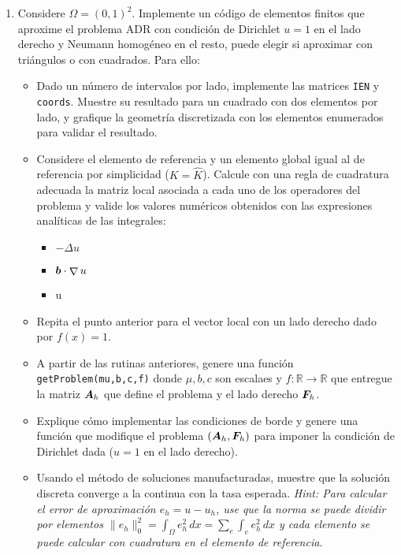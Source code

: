 \documentclass{article}
\renewcommand{\vec}{\vectorsym}
\newcommand{\mat}{\matrixsym}
\DeclareMathOperator{\grad}{\nabla}
\newcommand{\R}{\mathbb{R}}
\newcommand{\pts}[1]{[{\bf #1 puntos}] }
\begin{document}
\begin{enumerate}
    \item Considere $\Omega = (0,1)^2$. Implemente un código de elementos finitos que aproxime el problema ADR con condición de Dirichlet $u=1$ en el lado derecho y Neumann homogéneo en el resto, puede elegir si aproximar con triángulos o con cuadrados. Para ello: 
            \begin{itemize}
                \item\pts{1} Dado un número de intervalos por lado, implemente las matrices \texttt{IEN} y \texttt{coords}. Muestre su resultado para un cuadrado con dos elementos por lado, y grafique la geometría discretizada con los elementos enumerados para validar el resultado.
                \item\pts{3} Considere el elemento de referencia y un elemento global igual al de referencia por simplicidad ($K = \hat K$). Calcule con una regla de cuadratura adecuada la matriz local asociada a cada uno de los operadores del problema y valide los valores numéricos obtenidos con las expresiones analíticas de las integrales: 
                    \begin{itemize}
                        \item $-\Delta u$
                        \item $\vec b \cdot \grad u$
                        \item u
                    \end{itemize}
                \item\pts{2} Repita el punto anterior para el vector local con un lado derecho dado por $f(x) = 1$. 
                \item\pts{3} A partir de las rutinas anteriores, genere una función \texttt{getProblem(mu,b,c,f)} donde $\mu,b,c$ son escalaes y $f:\R\to\R$ que entregue la matriz $\mat A_h$ que define el problema y el lado derecho $\vec F_h$.
                \item\pts{2} Explique cómo implementar las condiciones de borde y genere una función que modifique el problema $(\mat A_h, \vec F_h)$ para imponer la condición de Dirichlet dada ($u=1$ en el lado derecho).
                \item\pts{3} Usando el método de soluciones manufacturadas, muestre que la solución discreta converge a la continua con la tasa esperada. \emph{Hint: Para calcular el error de aproximación $e_h = u - u_h$, use que la norma se puede dividir por elementos $\|e_h\|_0^2 = \int_\Omega e_h^2\,dx = \sum_e \int_e e_h^2\,dx$ y cada elemento se puede calcular con cuadratura en el elemento de referencia.}
            \end{itemize}
\end{enumerate}

\end{document}
